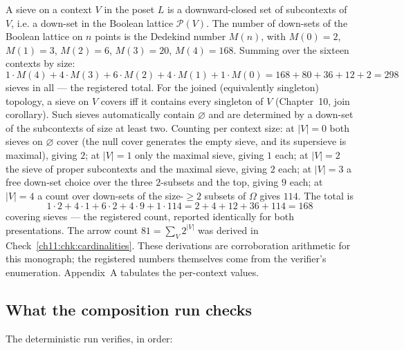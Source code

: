 \begin{remark}
\label{ch11:rem:counts}
A sieve on a context $V$ in the poset $L$ is a downward-closed set of
subcontexts of $V$, i.e. a down-set in the Boolean lattice
$\mathcal{P}(V)$. The number of down-sets of the Boolean lattice on $n$
points is the Dedekind number $M(n)$, with $M(0) = 2$, $M(1) = 3$,
$M(2) = 6$, $M(3) = 20$, $M(4) = 168$. Summing over the sixteen contexts by
size:
\[
1 \cdot M(4) + 4 \cdot M(3) + 6 \cdot M(2) + 4 \cdot M(1) + 1 \cdot M(0)
= 168 + 80 + 36 + 12 + 2 = 298
\]
sieves in all --- the registered total. For the joined (equivalently
singleton) topology, a sieve on $V$ covers iff it contains every singleton
of $V$ (Chapter~10, join corollary). Such sieves automatically contain
$\varnothing$ and are determined by a down-set of the subcontexts of size at
least two. Counting per context size: at $|V| = 0$ both sieves on
$\varnothing$ cover (the null cover generates the empty sieve, and its
supersieve is maximal), giving $2$; at $|V| = 1$ only the maximal sieve,
giving $1$ each; at $|V| = 2$ the sieve of proper subcontexts and the
maximal sieve, giving $2$ each; at $|V| = 3$ a free down-set choice over the
three $2$-subsets and the top, giving $9$ each; at $|V| = 4$ a count over
down-sets of the size-$\ge 2$ subsets of $\Omega$ gives $114$. The total is
\[
1 \cdot 2 + 4 \cdot 1 + 6 \cdot 2 + 4 \cdot 9 + 1 \cdot 114
= 2 + 4 + 12 + 36 + 114 = 168
\]
covering sieves --- the registered count, reported identically for both
presentations. The arrow count $81 = \sum_V 2^{|V|}$ was derived in
Check~\ref{ch11:chk:cardinalities}. These derivations are corroboration
arithmetic for this monograph; the registered numbers themselves come from
the verifier's enumeration. Appendix~A tabulates the per-context values.
\end{remark}

\subsection{What the composition run checks}
\label{ch11:sec:comprun}

The deterministic run verifies, in order:

